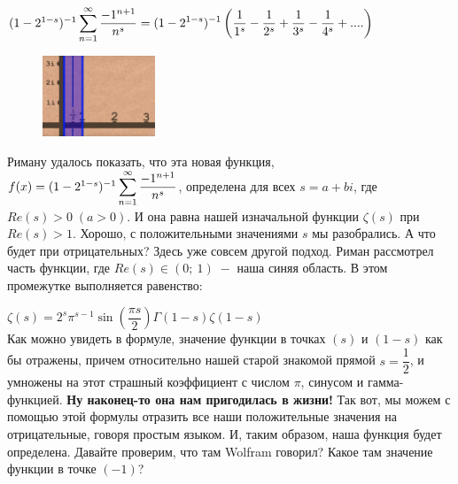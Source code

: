 \centerline{$(1-2^{1-s})^{-1}\displaystyle\sum\limits_{n=1}^{\infty} \dfrac{-1^{n+1}}{n^s}=(1-2^{1-s})^{-1} \left(\dfrac{1}{1^s}-\dfrac{1}{2^s}+\dfrac{1}{3^s}-\dfrac{1}{4^s}+....\right)$ }

\newline \hspace{20}
\begin{figure}
 \vspace{-20pt}
  \begin{center}
    \includegraphics[width=0.3\textwidth]{blue.png}
  \end{center}
   \vspace{-60pt}
\end{figure}
\hspace{20} Риману удалось показать, что эта новая функция,\\

$f(x) = (1-2^{1-s})^{-1}\displaystyle\sum\limits_{n=1}^{\infty} \dfrac{-1^{n+1}}{n^s}$, определена для всех $s=a+bi$, где $Re(s) > 0\; (a>0)$.  И она равна нашей изначальной функции $\zeta(s)$ при $Re(s) >1$. Хорошо, с положительными значениями $s$ мы разобрались. А что будет при отрицательных? Здесь уже совсем другой подход. Риман рассмотрел часть функции, где $Re(s) \in (0; \:1) \;- $ наша синяя область. В этом промежутке выполняется равенство:



\hspace{90}$\zeta (s)=2^{s}\pi ^{s-1}\sin \left({\dfrac{\pi s}{2}}\right)\Gamma (1-s)\zeta (1-s)$\\



\hspace{20} Как можно увидеть в формуле, значение функции в точках $(s)$ и $(1-s)$ как бы отражены, причем относительно нашей старой знакомой прямой $s=\dfrac{1}{2}$, и умножены на этот страшный коэффициент с числом $\pi$, синусом и гамма-функцией. \textbf{Ну наконец-то она нам пригодилась в жизни!} Так вот, мы можем с помощью этой формулы отразить все наши положительные значения на отрицательные, говоря простым языком. И, таким образом, наша функция будет определена. Давайте проверим, что там Wolfram говорил? Какое там значение функции в точке $(-1)$?\\


